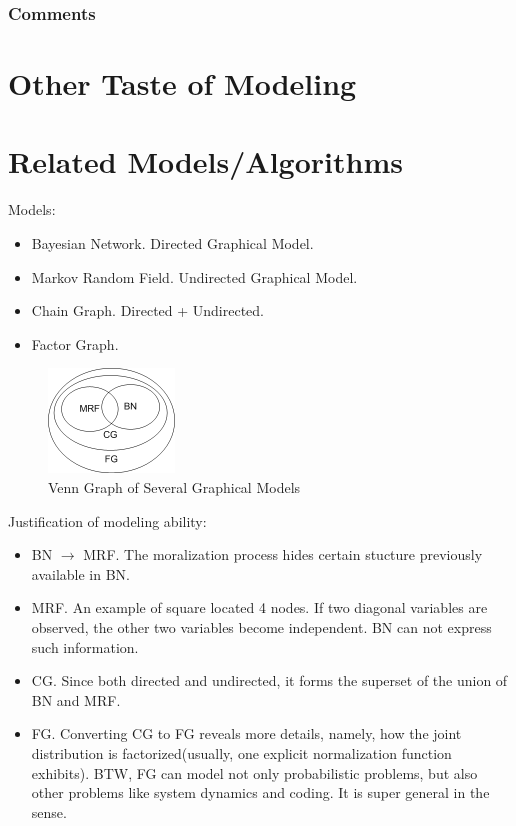\documentclass[11pt,a4paper]{article}
\begin{document}
\subsubsection{Comments}

\section{Other Taste of Modeling}



\section{Related Models/Algorithms}

Models:
\begin{itemize}
	\item Bayesian Network. Directed Graphical Model. 
	\item Markov Random Field. Undirected Graphical Model.
	\item Chain Graph. Directed + Undirected.  
	\item Factor Graph. 
\end{itemize}

\begin{figure}[htb]
\centering
	\includegraphics[width=0.3\textwidth]{illustration/graphical-venn.png}
	\caption{Venn Graph of Several Graphical Models}
\end{figure}

Justification of modeling ability:
\begin{itemize}
	\item BN $\rightarrow$ MRF. The moralization process hides certain stucture 
	previously available in BN. 
	\item MRF. An example of square located 4 nodes. If two diagonal variables 
	are observed, the other two variables become independent. BN can not express 
	such information. 
	\item CG. Since both directed and undirected, it forms the superset of 
	the union of BN and	MRF.
	\item FG. Converting CG to FG reveals more details, namely, how the joint 
	distribution is factorized(usually, one explicit normalization function 
	exhibits). BTW, FG can model not only probabilistic problems, but also 
	other problems like system dynamics and coding. It is super general in the
	sense.
\end{itemize}
\end{document}
